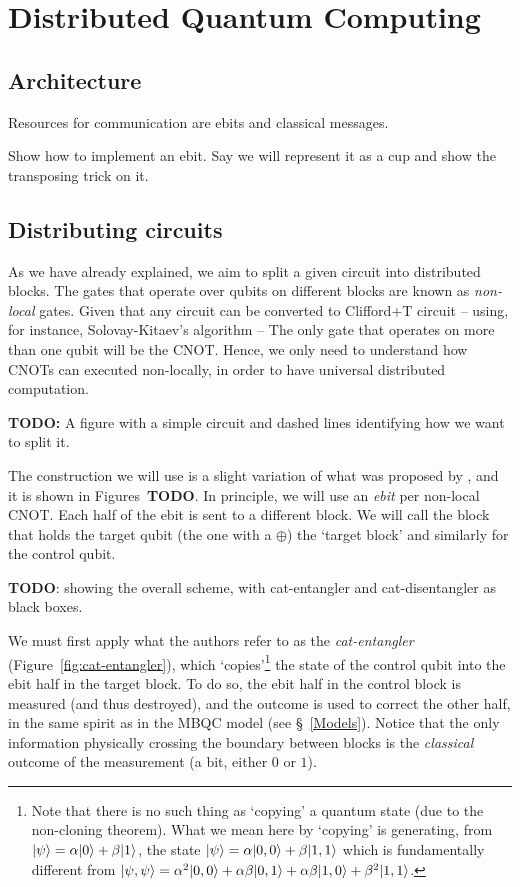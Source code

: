 \chapter{Distributed Quantum Computing}
\label{chap:Distributed}

\section{Architecture}
\label{DQC_Architecture}

Resources for communication are ebits and classical messages.

Show how to implement an ebit. Say we will represent it as a cup and show the transposing trick on it.

\section{Distributing circuits}
\label{IntroDistributing}

As we have already explained, we aim to split a given circuit into distributed blocks. The gates that operate over qubits on different blocks are known as \textit{non-local} gates. Given that any circuit can be converted to Clifford+T circuit -- using, for instance, Solovay-Kitaev's algorithm -- The only gate that operates on more than one qubit will be the CNOT. Hence, we only need to understand how CNOTs can executed non-locally, in order to have universal distributed computation.

\textbf{TODO:} A figure with a simple circuit and dashed lines identifying how we want to split it.

The construction we will use is a slight variation of what was proposed by \citet{NonLocalCNOT}, and it is shown in Figures~\textbf{TODO}. In principle, we will use an \textit{ebit} per non-local CNOT. Each half of the ebit is sent to a different block. We will call the block that holds the target qubit (the one with a \(\oplus\)) the `target block' and similarly for the control qubit. 

\textbf{TODO}: showing the overall scheme, with cat-entangler and cat-disentangler as black boxes.

We must first apply what the authors refer to as the \textit{cat-entangler} (Figure~\ref{fig:cat-entangler}), which `copies'\footnote{Note that there is no such thing as `copying' a quantum state (due to the non-cloning theorem). What we mean here by `copying' is generating, from \(\vert \psi \rangle = \alpha\vert 0 \rangle + \beta\vert 1 \rangle\), the state \(\vert \psi \rangle = \alpha\vert 0,0 \rangle + \beta\vert 1,1 \rangle\) which is fundamentally different from \(\vert \psi,\psi \rangle = \alpha^2\vert 0,0 \rangle + \alpha\beta\vert 0,1 \rangle + \alpha\beta\vert 1,0 \rangle + \beta^2\vert 1,1 \rangle\).} the state of the control qubit into the ebit half in the target block. To do so, the ebit half in the control block is measured (and thus destroyed), and the outcome is used to correct the other half, in the same spirit as in the MBQC model (see \S~\ref{Models}). Notice that the only information physically crossing the boundary between blocks is the \textit{classical} outcome of the measurement (a bit, either \(0\) or \(1\)).

